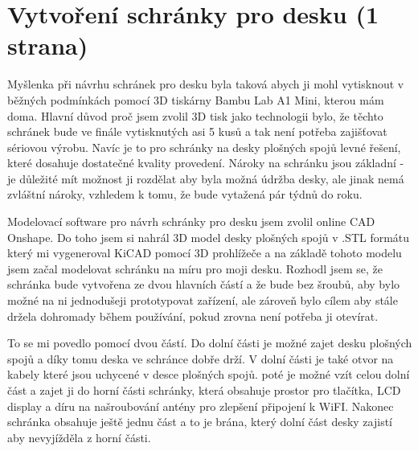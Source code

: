 \section{Vytvoření schránky pro desku (1 strana)}

Myšlenka při návrhu schránek pro desku byla taková abych ji mohl vytisknout v běžných podmínkách pomocí 3D tiskárny Bambu Lab A1 Mini, kterou mám doma. Hlavní důvod proč jsem zvolil 3D tisk jako technologii bylo, že těchto schránek bude ve finále vytisknutých asi 5 kusů a tak není potřeba zajišťovat sériovou výrobu. Navíc je to pro schránky na desky plošných spojů levné řešení, které dosahuje dostatečné kvality provedení. Nároky na schránku jsou základní - je důležité mít možnost ji rozdělat aby byla možná údržba desky, ale jinak nemá zvláštní nároky, vzhledem k tomu, že bude vytažená pár týdnů do roku.

Modelovací software pro návrh schránky pro desku jsem zvolil online CAD Onshape. Do toho jsem si nahrál 3D model desky plošných spojů v .STL formátu který mi vygeneroval KiCAD pomocí 3D prohlížeče a na základě tohoto modelu jsem začal modelovat schránku na míru pro moji desku. Rozhodl jsem se, že schránka bude vytvořena ze dvou hlavních částí a že bude bez šroubů, aby bylo možné na ni jednodušeji prototypovat zařízení, ale zároveň bylo cílem aby stále držela dohromady během používání, pokud zrovna není potřeba ji otevírat.

To se mi povedlo pomocí dvou částí. Do dolní části je možné zajet desku plošných spojů a díky tomu deska ve schránce dobře drží. V dolní části je také otvor na kabely které jsou uchycené v desce plošných spojů. poté je možné vzít celou dolní část a zajet ji do horní části schránky, která obsahuje prostor pro tlačítka, LCD display a díru na našroubování antény pro zlepšení připojení k WiFI. Nakonec schránka obsahuje ještě jednu část a to je brána, který dolní část desky zajistí aby nevyjížděla z horní části.

